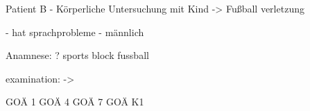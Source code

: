 
Patient B - Körperliche Untersuchung mit Kind -> Fußball verletzung

- hat sprachprobleme
- männlich


Anamnese:
? sports block fussball

examination:
->

GOÄ 1
GOÄ 4
GOÄ 7
GOÄ K1
